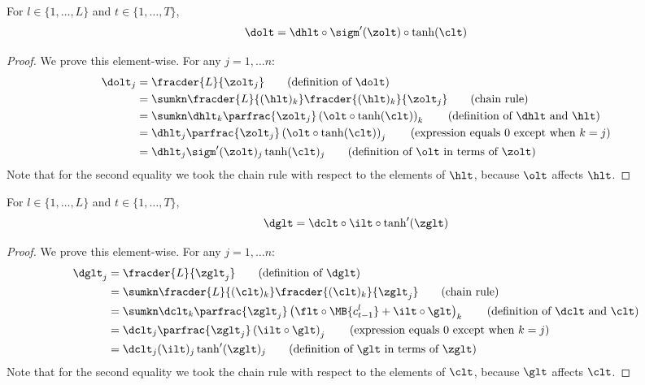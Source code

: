 \begin{lemma}
For $l \in \{1,\dots, L\}$ and $t \in \{1, \dots, T\}$,
\begin{equation}
\dolt = \dhlt  \circ \sigm'(\zolt) \circ \tanh(\clt)
\end{equation} 
\end{lemma}
\begin{proof}
We prove this element-wise. For any $j=1,\dots n$:
\begin{align} 
\dolt_j &= \fracder{L}{\zolt_j} \tag{definition of $\dolt$} \\
&= \sumkn \fracder{L}{(\hlt)_k} \fracder{(\hlt)_k}{\zolt_j} \tag{chain rule} \\
&= \sumkn \dhlt_k \parfrac{\zolt_j} \left( \olt \circ \tanh(\clt) \right)_k \tag{definition of $\dhlt$ and $\hlt$} \\
&= \dhlt_j \parfrac{\zolt_j} \left( \olt \circ \tanh(\clt) \right)_j \tag{expression equals 0 except when $k=j$} \\
&= \dhlt_j \sigm'(\zolt)_j \tanh(\clt)_j \tag{definition of $\olt$ in terms of $\zolt$}
\end{align}
Note that for the second equality we took the chain rule with respect to the elements of $\hlt$, because $\olt$ affects $\hlt$.
\end{proof}

\begin{lemma}
For $l \in \{1,\dots, L\}$ and $t \in \{1, \dots, T\}$,
\begin{equation}
\dglt = \dclt \circ \ilt \circ \tanh'(\zglt)
\end{equation} 
\end{lemma}
\begin{proof}
We prove this element-wise. For any $j=1,\dots n$:
\begin{align} 
\dglt_j &= \fracder{L}{\zglt_j} \tag{definition of $\dglt$} \\
&= \sumkn \fracder{L}{(\clt)_k} \fracder{(\clt)_k}{\zglt_j} \tag{chain rule} \\
&= \sumkn \dclt_k \parfrac{\zglt_j} \left( \flt \circ \MB{c^l_{t-1}} + \ilt \circ \glt \right)_k \tag{definition of $\dclt$ and $\clt$} \\
&= \dclt_j \parfrac{\zglt_j} \left(\ilt \circ \glt  \right)_j \tag{expression equals 0 except when $k=j$} \\
&= \dclt_j (\ilt)_j \tanh'(\zglt)_j \tag{definition of $\glt$ in terms of $\zglt$}
\end{align}
Note that for the second equality we took the chain rule with respect to the elements of $\clt$, because $\glt$ affects $\clt$.
\end{proof}


